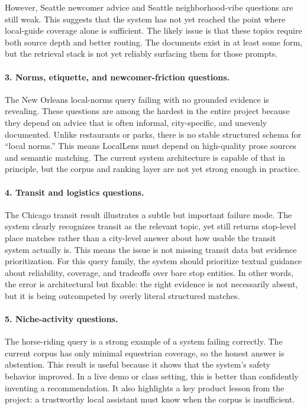 \documentclass[11pt]{article}
\begin{document}
However, Seattle newcomer advice and Seattle neighborhood-vibe questions are still weak. This suggests that the system has not yet reached the point where local-guide coverage alone is sufficient. The likely issue is that these topics require both source depth and better routing. The documents exist in at least some form, but the retrieval stack is not yet reliably surfacing them for those prompts.

\paragraph{3. Norms, etiquette, and newcomer-friction questions.}
The New Orleans local-norms query failing with no grounded evidence is revealing. These questions are among the hardest in the entire project because they depend on advice that is often informal, city-specific, and unevenly documented. Unlike restaurants or parks, there is no stable structured schema for ``local norms.'' This means LocalLens must depend on high-quality prose sources and semantic matching. The current system architecture is capable of that in principle, but the corpus and ranking layer are not yet strong enough in practice.

\paragraph{4. Transit and logistics questions.}
The Chicago transit result illustrates a subtle but important failure mode. The system clearly recognizes transit as the relevant topic, yet still returns stop-level place matches rather than a city-level answer about how usable the transit system actually is. This means the issue is not missing transit data but evidence prioritization. For this query family, the system should prioritize textual guidance about reliability, coverage, and tradeoffs over bare stop entities. In other words, the error is architectural but fixable: the right evidence is not necessarily absent, but it is being outcompeted by overly literal structured matches.

\paragraph{5. Niche-activity questions.}
The horse-riding query is a strong example of a system failing correctly. The current corpus has only minimal equestrian coverage, so the honest answer is abstention. This result is useful because it shows that the system's safety behavior improved. In a live demo or class setting, this is better than confidently inventing a recommendation. It also highlights a key product lesson from the project: a trustworthy local assistant must know when the corpus is insufficient.
\end{document}
